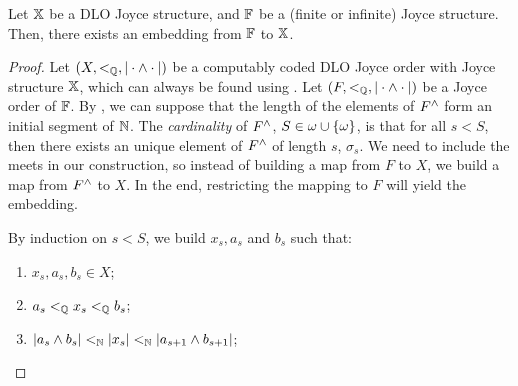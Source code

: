 \begin{theorem}[$\RCA_0$]\label{th:4.1LaflammeDevlin}
  Let $\mathbb{X}$ be a DLO Joyce structure, and $\mathbb{F}$ be a (finite or infinite) Joyce structure. Then, there exists an embedding from $\mathbb{F}$ to $\mathbb{X}$.
\end{theorem}
\begin{proof}
  Let $(X,<_{\mathbb{Q}},|\cdot\wedge\cdot|)$ be a computably coded DLO Joyce order with Joyce structure $\mathbb{X}$, which can always be found using . Let $(F,<_{\mathbb{Q}},|\cdot\wedge\cdot|)$ be a Joyce order of $\mathbb{F}$. By , we can suppose that the length of the elements of ${F}^{\wedge}$ form an initial segment of $\mathbb{N}$. The \emph{cardinality} of ${F}^{\wedge}$, $S\in\omega\cup\{\omega\}$, is that for all $s<S$, then there exists an unique element of ${F}^{\wedge}$ of length $s$, $\sigma_s$.   We need to include the meets in our construction, so instead of building a map from $F$ to $X$, we build a map from ${F}^{\wedge}$ to $X$. In the end, restricting the mapping to $F$ will yield the embedding.

  By induction on $s< S$, we build $x_s, a_s$ and $b_s$ such that:
  \begin{enumerate}
  \item\label{it:Dev-LaFlamme-1} $x_s,a_s,b_s\in X$;
  \item\label{it:Dev-LaFlamme-2} $a_s<_{\mathbb{Q}} x_s<_{\mathbb{Q}} b_s$; %
  \item\label{it:Dev-LaFlamme-3} $|{a_{s}}\wedge{b_{s}}|<_{\mathbb{N}}|{x_s}|<_{\mathbb{N}}|{a_{s+1}}\wedge{b_{s+1}}|$;
  

\end{enumerate}
\end{proof}
